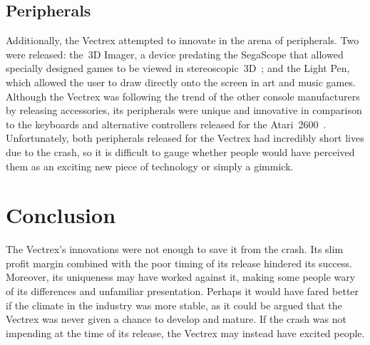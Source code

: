 \documentclass{scrartcl}
\begin{document}
\subsection*{Peripherals} 
Additionally, the Vectrex attempted to innovate in the arena of peripherals. Two were released: the~3D Imager, a device predating the SegaScope that allowed specially designed games to be viewed in stereoscopic~3D~\cite{zachara:stereo}; and the Light Pen, which allowed the user to draw directly onto the screen in art and music games. Although the Vectrex was following the trend of the other console manufacturers by releasing accessories, its peripherals were unique and innovative in comparison to the keyboards and alternative controllers released for the Atari~2600~\cite[pp. 24, 62]{montfort:beam}. Unfortunately, both peripherals released for the Vectrex had incredibly short lives due to the crash, so it is difficult to gauge whether people would have perceived them as an exciting new piece of technology or simply a gimmick.




\section*{Conclusion}
The Vectrex's innovations were not enough to save it from the crash. Its slim profit margin combined with the poor timing of its release hindered its success. Moreover, its uniqueness may have worked against it, making some people wary of its differences and unfamiliar presentation. Perhaps it would have fared better if the climate in the industry was more stable, as it could be argued that the Vectrex was never given a chance to develop and mature. If the crash was not impending at the time of its release, the Vectrex may instead have excited people.




\end{document}
